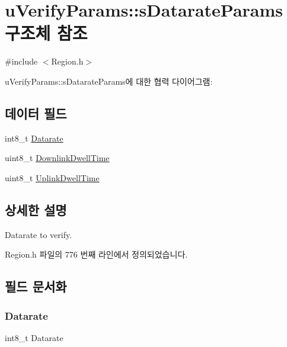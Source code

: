 \hypertarget{structu_verify_params_1_1s_datarate_params}{}\section{u\+Verify\+Params\+:\+:s\+Datarate\+Params 구조체 참조}
\label{structu_verify_params_1_1s_datarate_params}


{\ttfamily \#include $<$Region.\+h$>$}



u\+Verify\+Params\+:\+:s\+Datarate\+Params에 대한 협력 다이어그램\+:
\subsection*{데이터 필드}
\begin{DoxyCompactItemize}
\item 
int8\+\_\+t \mbox{\hyperlink{structu_verify_params_1_1s_datarate_params_ae2f6080f3aa0e9485c55513ca56bb24d}{Datarate}}
\item 
uint8\+\_\+t \mbox{\hyperlink{structu_verify_params_1_1s_datarate_params_a63074ce7d23ff98956f5d6f4054f235f}{Downlink\+Dwell\+Time}}
\item 
uint8\+\_\+t \mbox{\hyperlink{structu_verify_params_1_1s_datarate_params_a0e6663762d6f9173bc8d8cb018f8f17a}{Uplink\+Dwell\+Time}}
\end{DoxyCompactItemize}


\subsection{상세한 설명}
Datarate to verify. 

Region.\+h 파일의 776 번째 라인에서 정의되었습니다.



\subsection{필드 문서화}
\mbox{\label{structu_verify_params_1_1s_datarate_params_ae2f6080f3aa0e9485c55513ca56bb24d}} 
\subsubsection{\texorpdfstring{Datarate}{Datarate}}
{\footnotesize\ttfamily int8\+\_\+t Datarate}

